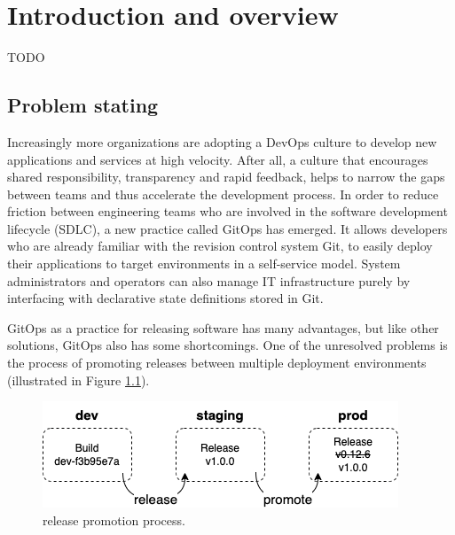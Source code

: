 
\chapter{Introduction and overview}

TODO

\section{Problem stating}


Increasingly more organizations are adopting 
a DevOps culture to develop new applications and services at high velocity. 
After all, a culture that encourages shared responsibility, transparency and rapid feedback, 
helps to narrow the gaps between teams and thus accelerate the development process.
In order to
reduce friction between engineering teams who are involved in the software development lifecycle (SDLC),
a new practice called GitOps has emerged.
It allows developers who are already familiar with the revision control system Git,
to easily deploy their applications to target environments in a self-service model.
System administrators and operators can also manage IT infrastructure
purely by interfacing with declarative state definitions stored in Git.
\bigskip



\noindent
GitOps as a practice for releasing software has many advantages,
but like other solutions, GitOps also has some shortcomings.
One of the unresolved problems is
the process of promoting releases between multiple deployment environments (illustrated in Figure \ref{fig:releasePromotionProcess}).

\begin{figure}[h]
	\centering
	\includegraphics[width=.55\linewidth]{figures/release-promotion.drawio.png}
	\caption{release promotion process.
	}
	\label{fig:releasePromotionProcess}	
\end{figure}

